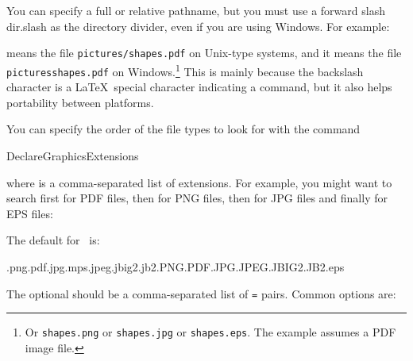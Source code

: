 You can specify a full or relative pathname, but you must use a
forward slash \gls{dir.slash} as the directory divider, even if you are using
Windows. For example:
\begin{codeS}
\end{codeS}
means the file \texttt{pictures/shapes.pdf} on Unix-type systems,
and it means the file \texttt{pictures\backslashsym shapes.pdf} on
Windows.\footnote{Or \texttt{shapes.png} or \texttt{shapes.jpg} or
\texttt{shapes.eps}. The example assumes a PDF image file.} This is
mainly because the backslash character is a \LaTeX\ special
character indicating a command, but it also helps portability
between platforms.

You can specify the order of the file types to look for with the command
\begin{definition}
\gls{DeclareGraphicsExtensions}
\end{definition}%
where  is a comma-separated list of extensions.  
For example, 
you might want to search first for PDF files, then for PNG files,
then for JPG files and finally for EPS files:
\begin{codeS}
\end{codeS}%
The default for \iPDFLaTeX\ is:
\begin{flushleft}\ttfamily
.png\comma .pdf\comma .jpg\comma .mps\comma .jpeg\comma .jbig2\comma .jb2\comma .PNG\comma .PDF\comma .JPG\comma .JPEG\comma .JBIG2\comma .JB2\comma .eps
\end{flushleft}

The \gls{optional} 
should be a comma-separated list of
\texttt{=} pairs. Common options are:

